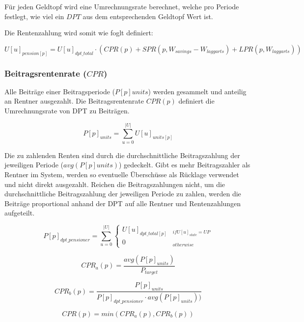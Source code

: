Für jeden Geldtopf wird eine Umrechnungsrate berechnet, welche pro 
Periode festlegt, wie viel ein $DPT$ aus dem entsprechenden
Geldtopf Wert ist.

Die Rentenzahlung wird somit wie foglt definiert:

\begin{dmath}
U[u]_{pension[p]} = U[u]_{dpt\_total} \cdot (CPR(p) + SPR(p, W_{savings} - W_{laggarts}) + LPR(p, W_{laggarts}))
\end{dmath}

\subsubsection*{Beitragsrentenrate ($CPR$)}
Alle Beiträge einer Beitragsperiode ($P[p]units$) werden gesammelt und anteilig an Rentner ausgezahlt. Die Beitragsrentenrate $CPR(p)$ definiert die Umrechnungsrate von DPT zu Beiträgen.

\begin{equation}
P[p]_{units} = \sum_{u=0}^{|U|} U[u]_{units[p]}
\end{equation}

Die zu zahlenden Renten sind durch die durchschnittliche Beitragszahlung der 
jeweiligen Periode ($avg(P[p]units)$) gedeckelt. Gibt es mehr Beitragszahler als Rentner im System, werden so eventuelle Überschüsse als Rücklage verwendet und nicht direkt ausgezahlt. Reichen die Beitragszahlungen nicht, um die durchschnittliche Beitragszahlung der 
jeweiligen Periode zu zahlen, werden die Beiträge proportional anhand der DPT auf alle Rentner und Rentenzahlungen  aufgeteilt.

\begin{equation}
P[p]_{dpt\_pensioner} = 
\sum_{u=0}^{|U|} \begin{cases} 
U[u]_{dpt\_total[p]} & _{if U[u]_{state} = UP}\\
0 & _{otherwise}
\end{cases}
\end{equation}

\begin{equation*}
CPR_{a}(p) = \frac{avg(P[p]_{units})}{P_{target}}
\end{equation*}

\begin{equation*}
CPR_{b}(p) = \frac{P[p]_{units}} {P[p]_{dpt\_pensioner} \cdot avg(P[p]_{units}))}
\end{equation*}

\begin{equation}
CPR(p) = min(CPR_{a}(p), CPR_{b}(p))
\end{equation}


